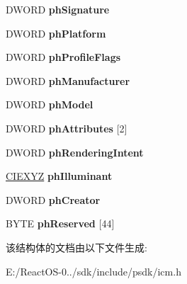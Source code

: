 \begin{DoxyCompactItemize}
D\+W\+O\+RD {\bfseries ph\+Signature}
\item 
\mbox{\label{structtag_p_r_o_f_i_l_e_h_e_a_d_e_r_af45ebd9be83abf177efdc21dc519312d}} 
D\+W\+O\+RD {\bfseries ph\+Platform}
\item 
\mbox{\label{structtag_p_r_o_f_i_l_e_h_e_a_d_e_r_accf215ad23b1aab0d56d83b4319863a9}} 
D\+W\+O\+RD {\bfseries ph\+Profile\+Flags}
\item 
\mbox{\label{structtag_p_r_o_f_i_l_e_h_e_a_d_e_r_acb160686038f5aeef950b25b9b9d1cd7}} 
D\+W\+O\+RD {\bfseries ph\+Manufacturer}
\item 
\mbox{\label{structtag_p_r_o_f_i_l_e_h_e_a_d_e_r_a05c29535e183d58a1d3a8231f21228bd}} 
D\+W\+O\+RD {\bfseries ph\+Model}
\item 
\mbox{\label{structtag_p_r_o_f_i_l_e_h_e_a_d_e_r_a6d3e58dd6e248889c40882a7d983ca54}} 
D\+W\+O\+RD {\bfseries ph\+Attributes} \mbox{[}2\mbox{]}
\item 
\mbox{\label{structtag_p_r_o_f_i_l_e_h_e_a_d_e_r_a87af4a9417bc60273cbcd1f1926aa308}} 
D\+W\+O\+RD {\bfseries ph\+Rendering\+Intent}
\item 
\mbox{\label{structtag_p_r_o_f_i_l_e_h_e_a_d_e_r_a1fa50f0ce58ed093ad5767aea0626ce7}} 
\hyperlink{structtag_c_i_e_x_y_z}{C\+I\+E\+X\+YZ} {\bfseries ph\+Illuminant}
\item 
\mbox{\label{structtag_p_r_o_f_i_l_e_h_e_a_d_e_r_a190853bef729aca2f73567b57a394259}} 
D\+W\+O\+RD {\bfseries ph\+Creator}
\item 
\mbox{\label{structtag_p_r_o_f_i_l_e_h_e_a_d_e_r_af355d31174eb0294deeaa5b2459bfd80}} 
B\+Y\+TE {\bfseries ph\+Reserved} \mbox{[}44\mbox{]}
\end{DoxyCompactItemize}


该结构体的文档由以下文件生成\+:\begin{DoxyCompactItemize}
\item 
E\+:/\+React\+O\+S-\/0../sdk/include/psdk/icm.\+h\end{DoxyCompactItemize}
